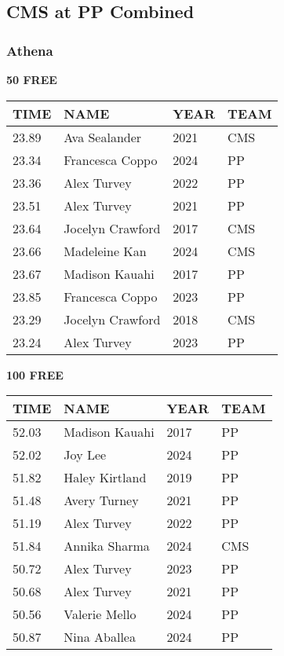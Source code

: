 \vspace{0.4cm}

\newpage

\subsection{CMS at PP Combined}
\subsubsection{Athena}

\begin{minipage}[t]{0.48\textwidth}
\centering
\textbf{50 FREE}\\[0.05cm]
\begin{tabular}{@{}p{1.8cm}p{2.8cm}p{1.2cm}p{1.4cm}@{}}
\hline
\textbf{TIME} & \textbf{NAME} & \textbf{YEAR} & \textbf{TEAM} \\
\hline
23.89 & Ava Sealander & 2021 & CMS \\
23.34 & Francesca Coppo & 2024 & PP \\
23.36 & Alex Turvey & 2022 & PP \\
23.51 & Alex Turvey & 2021 & PP \\
23.64 & Jocelyn Crawford & 2017 & CMS \\
23.66 & Madeleine Kan & 2024 & CMS \\
23.67 & Madison Kauahi & 2017 & PP \\
23.85 & Francesca Coppo & 2023 & PP \\
23.29 & Jocelyn Crawford & 2018 & CMS \\
23.24 & Alex Turvey & 2023 & PP \\
\hline
\end{tabular}
\end{minipage}\hfill
\begin{minipage}[t]{0.48\textwidth}
\centering
\textbf{100 FREE}\\[0.05cm]
\begin{tabular}{@{}p{1.8cm}p{2.8cm}p{1.2cm}p{1.4cm}@{}}
\hline
\textbf{TIME} & \textbf{NAME} & \textbf{YEAR} & \textbf{TEAM} \\
\hline
52.03 & Madison Kauahi & 2017 & PP \\
52.02 & Joy Lee & 2024 & PP \\
51.82 & Haley Kirtland & 2019 & PP \\
51.48 & Avery Turney & 2021 & PP \\
51.19 & Alex Turvey & 2022 & PP \\
51.84 & Annika Sharma & 2024 & CMS \\
50.72 & Alex Turvey & 2023 & PP \\
50.68 & Alex Turvey & 2021 & PP \\
50.56 & Valerie Mello & 2024 & PP \\
50.87 & Nina Aballea & 2024 & PP \\
\hline
\end{tabular}
\end{minipage}

